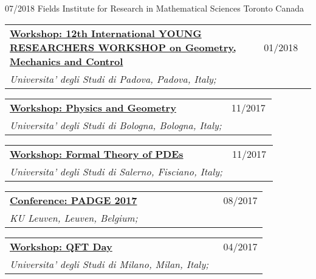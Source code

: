 \documentclass[a4paper]{article}
\newcommand{\longvoice}[8]{
	\begin{tabular}{p{0.83\linewidth} p{0.17\linewidth} }
		\textbf{\href{#3}{#2: #1}} & #4 
		\\ 
		\textit{#5, #6, #7;} & {\small\emph{#8}}
	\end{tabular}
	\vspace{.5em}
}
\begin{document}
		{07/2018}
		{Fields Institute for Research in Mathematical Sciences}
		{Toronto}
		{Canada}
		{}
	\longvoice{12th International YOUNG RESEARCHERS WORKSHOP on Geometry, Mechanics and Control}
		{Workshop}
		{http://events.math.unipd.it/12YRW/}
		{01/2018}
		{Universita' degli Studi di Padova}
		{Padova}
		{Italy}
		{}
	\longvoice{Physics and Geometry}
		{Workshop}
		{https://agenda.infn.it/conferenceDisplay.py?confId=14261}
		{11/2017}
		{Universita' degli Studi di Bologna}
		{Bologna}
		{Italy}
		{}
	\longvoice{Formal Theory of PDEs}
		{Workshop}
		{http://www.dipmat2.unisa.it/people/vitagliano/www/micro-workshop.html}
		{11/2017}
		{Universita' degli Studi di Salerno}
		{Fisciano}
		{Italy}
		{}
	\longvoice{PADGE 2017}
		{Conference}
		{https://web.archive.org/web/20170924130155/https://wis.kuleuven.be/events/padge2017}
		{08/2017}
		{KU Leuven}
		{Leuven}
		{Belgium}
		{}
	\longvoice{QFT Day}
		{Workshop}
		{https://web.archive.org/web/20170924130005/http://www.matematica.unimi.it/extfiles/unimidire/66001/attachment/qft-day-2017-1.pdf}
		{04/2017}
		{Universita' degli Studi di Milano}
		{Milan}
		{Italy}
		{}

\end{document}
